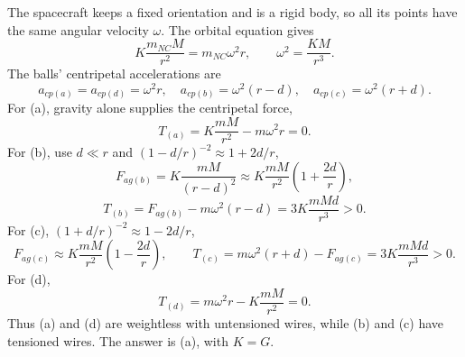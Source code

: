 The spacecraft keeps a fixed orientation and is a rigid body, so all its
points have the same angular velocity $\omega$. The orbital equation gives
\[
K\frac{m_{NC}M}{r^2}=m_{NC}\omega^2r,\qquad \omega^2=\frac{KM}{r^3}.
\]
The balls' centripetal accelerations are
\[
a_{cp(a)}=a_{cp(d)}=\omega^2r,\quad
a_{cp(b)}=\omega^2(r-d),\quad a_{cp(c)}=\omega^2(r+d).
\]
For (a), gravity alone supplies the centripetal force,
\[
T_{(a)}=K\frac{mM}{r^2}-m\omega^2r=0.
\]
For (b), use $d\ll r$ and $(1-d/r)^{-2}\approx1+2d/r$,
\[
F_{ag(b)}=K\frac{mM}{(r-d)^2}
\approx K\frac{mM}{r^2}\left(1+\frac{2d}{r}\right),
\]
\[
T_{(b)}=F_{ag(b)}-m\omega^2(r-d)
=3K\frac{mMd}{r^3}>0.
\]
For (c), $(1+d/r)^{-2}\approx1-2d/r$,
\[
F_{ag(c)}\approx K\frac{mM}{r^2}\left(1-\frac{2d}{r}\right),\qquad
T_{(c)}=m\omega^2(r+d)-F_{ag(c)}=3K\frac{mMd}{r^3}>0.
\]
For (d),
\[T_{(d)}=m\omega^2r-K\frac{mM}{r^2}=0.\]
Thus (a) and (d) are weightless with untensioned wires, while (b) and (c)
have tensioned wires. The answer is (a), with $K=G$.
